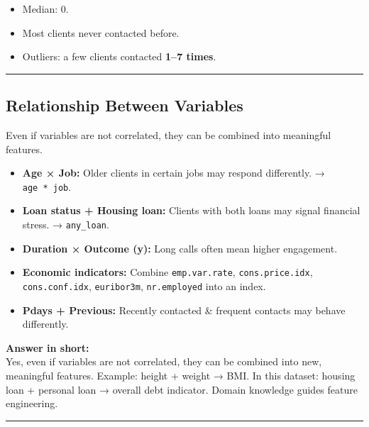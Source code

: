\documentclass[
]{article}
\providecommand{\tightlist}{%
  \setlength{\itemsep}{0pt}\setlength{\parskip}{0pt}}
\begin{document}
\begin{itemize}
\tightlist
\item
  Median: 0.\\
\item
  Most clients never contacted before.\\
\item
  Outliers: a few clients contacted \textbf{1--7 times}.
\end{itemize}

\begin{center}\rule{0.5\linewidth}{0.5pt}\end{center}

\subsection{Relationship Between
Variables}\label{relationship-between-variables}

Even if variables are not correlated, they can be combined into
meaningful features.

\begin{itemize}
\tightlist
\item
  \textbf{Age × Job:} Older clients in certain jobs may respond
  differently. → \texttt{age\ *\ job}.\\
\item
  \textbf{Loan status + Housing loan:} Clients with both loans may
  signal financial stress. → \texttt{any\_loan}.\\
\item
  \textbf{Duration × Outcome (y):} Long calls often mean higher
  engagement.\\
\item
  \textbf{Economic indicators:} Combine \texttt{emp.var.rate},
  \texttt{cons.price.idx}, \texttt{cons.conf.idx}, \texttt{euribor3m},
  \texttt{nr.employed} into an index.\\
\item
  \textbf{Pdays + Previous:} Recently contacted \& frequent contacts may
  behave differently.
\end{itemize}

\textbf{Answer in short:}\\
Yes, even if variables are not correlated, they can be combined into
new, meaningful features. Example: height + weight → BMI. In this
dataset: housing loan + personal loan → overall debt indicator. Domain
knowledge guides feature engineering.

\begin{center}\rule{0.5\linewidth}{0.5pt}\end{center}
\end{document}
